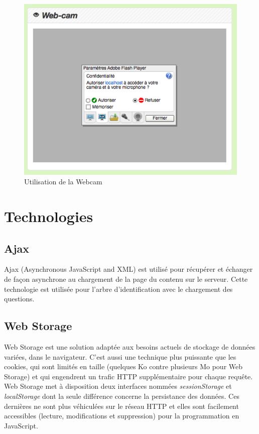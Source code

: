 \documentclass[twoside]{EPURapport}
\begin{document}
		\begin{figure}[hbtp]
			\centering
			\includegraphics[scale=0.5]{images/lib-webcam.png}
			\caption{Utilisation de la Webcam}
		\end{figure}
	
	\section{Technologies}
	\label{tec}
	
		\subsection{Ajax}
		\label{tec:ajax}
		Ajax (Asynchronous JavaScript and XML) est utilisé pour récupérer et échanger de façon asynchrone au chargement de la page du contenu sur le serveur. Cette technologie est utilisée pour l'arbre d'identification avec le chargement des questions.
		
		\subsection{Web Storage}
		\label{tec:storage}
		Web Storage est une solution adaptée aux besoins actuels de stockage de données variées, dans le navigateur. C'est aussi une technique plus puissante que les cookies, qui sont limités en taille (quelques Ko contre plusieurs Mo pour Web Storage) et qui engendrent un trafic HTTP supplémentaire pour chaque requête.\\
		
		Web Storage met à disposition deux interfaces nommées \emph{sessionStorage} et \emph{localStorage} dont la seule différence concerne la persistance des données. Ces dernières ne sont plus véhiculées sur le réseau HTTP et elles sont facilement accessibles (lecture, modifications et suppression) pour la programmation en JavaScript.\\
		
\end{document}
